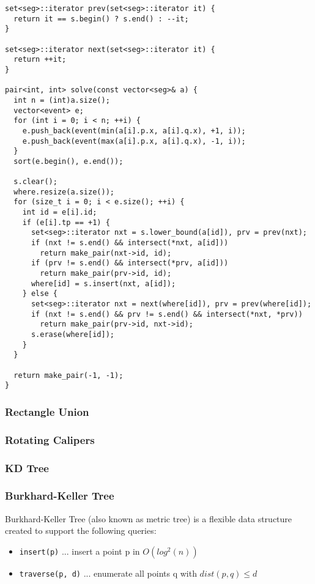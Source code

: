 \begin{center}
\begin{minipage}[t]{0.5\linewidth}
\begin{lstlisting}
set<seg>::iterator prev(set<seg>::iterator it) {
  return it == s.begin() ? s.end() : --it;
}

set<seg>::iterator next(set<seg>::iterator it) {
  return ++it;
}

pair<int, int> solve(const vector<seg>& a) {
  int n = (int)a.size();
  vector<event> e;
  for (int i = 0; i < n; ++i) {
    e.push_back(event(min(a[i].p.x, a[i].q.x), +1, i));
    e.push_back(event(max(a[i].p.x, a[i].q.x), -1, i));
  }
  sort(e.begin(), e.end());

  s.clear();
  where.resize(a.size());
  for (size_t i = 0; i < e.size(); ++i) {
    int id = e[i].id;
    if (e[i].tp == +1) {
      set<seg>::iterator nxt = s.lower_bound(a[id]), prv = prev(nxt);
      if (nxt != s.end() && intersect(*nxt, a[id]))
        return make_pair(nxt->id, id);
      if (prv != s.end() && intersect(*prv, a[id]))
        return make_pair(prv->id, id);
      where[id] = s.insert(nxt, a[id]);
    } else {
      set<seg>::iterator nxt = next(where[id]), prv = prev(where[id]);
      if (nxt != s.end() && prv != s.end() && intersect(*nxt, *prv))
        return make_pair(prv->id, nxt->id);
      s.erase(where[id]);
    }
  }

  return make_pair(-1, -1);
}
\end{lstlisting}
\end{minipage}
\end{center}
  
\subsubsection{Rectangle Union}
\subsubsection{Rotating Calipers}
\subsubsection{KD Tree}

\newpage
\subsubsection{Burkhard-Keller Tree}

Burkhard-Keller Tree \cite{Burkhard1973Apr} (also known as metric tree) is a flexible data structure
created to support the following queries:

{
\begin{itemize}
  \item{\lstinline{insert(p)} ... insert a point p in $O(log^2(n))$}
  \item{\lstinline{traverse(p, d)} ... enumerate all points q with $dist(p, q) \leq d$}
\end{itemize}
}

